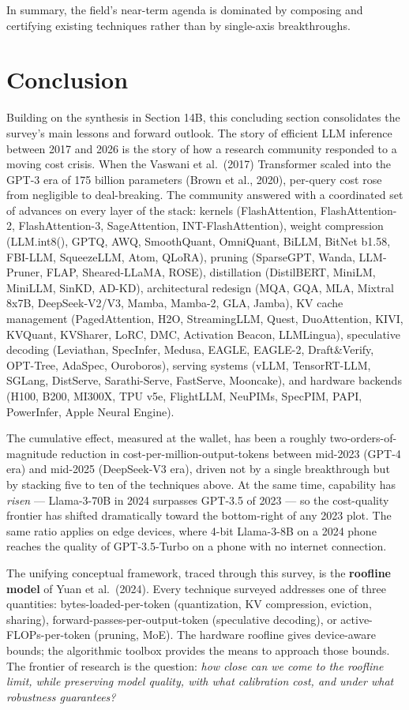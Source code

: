In summary, the field's near-term agenda is dominated by composing and certifying existing techniques rather than by single-axis breakthroughs.

\section{Conclusion}\label{conclusion}

Building on the synthesis in Section 14B, this concluding section consolidates the survey's main lessons and forward outlook. The story of efficient LLM inference between 2017 and 2026 is the story of how a research community responded to a moving cost crisis. When the Vaswani et al.~(2017) Transformer scaled into the GPT-3 era of 175 billion parameters (Brown et al., 2020), per-query cost rose from negligible to deal-breaking. The community answered with a coordinated set of advances on every layer of the stack: kernels (FlashAttention, FlashAttention-2, FlashAttention-3, SageAttention, INT-FlashAttention), weight compression (LLM.int8(), GPTQ, AWQ, SmoothQuant, OmniQuant, BiLLM, BitNet b1.58, FBI-LLM, SqueezeLLM, Atom, QLoRA), pruning (SparseGPT, Wanda, LLM-Pruner, FLAP, Sheared-LLaMA, ROSE), distillation (DistilBERT, MiniLM, MiniLLM, SinKD, AD-KD), architectural redesign (MQA, GQA, MLA, Mixtral 8x7B, DeepSeek-V2/V3, Mamba, Mamba-2, GLA, Jamba), KV cache management (PagedAttention, H2O, StreamingLLM, Quest, DuoAttention, KIVI, KVQuant, KVSharer, LoRC, DMC, Activation Beacon, LLMLingua), speculative decoding (Leviathan, SpecInfer, Medusa, EAGLE, EAGLE-2, Draft\&Verify, OPT-Tree, AdaSpec, Ouroboros), serving systems (vLLM, TensorRT-LLM, SGLang, DistServe, Sarathi-Serve, FastServe, Mooncake), and hardware backends (H100, B200, MI300X, TPU v5e, FlightLLM, NeuPIMs, SpecPIM, PAPI, PowerInfer, Apple Neural Engine).

The cumulative effect, measured at the wallet, has been a roughly two-orders-of-magnitude reduction in cost-per-million-output-tokens between mid-2023 (GPT-4 era) and mid-2025 (DeepSeek-V3 era), driven not by a single breakthrough but by stacking five to ten of the techniques above. At the same time, capability has \emph{risen} --- Llama-3-70B in 2024 surpasses GPT-3.5 of 2023 --- so the cost-quality frontier has shifted dramatically toward the bottom-right of any 2023 plot. The same ratio applies on edge devices, where 4-bit Llama-3-8B on a 2024 phone reaches the quality of GPT-3.5-Turbo on a phone with no internet connection.

The unifying conceptual framework, traced through this survey, is the \textbf{roofline model} of Yuan et al.~(2024). Every technique surveyed addresses one of three quantities: bytes-loaded-per-token (quantization, KV compression, eviction, sharing), forward-passes-per-output-token (speculative decoding), or active-FLOPs-per-token (pruning, MoE). The hardware roofline gives device-aware bounds; the algorithmic toolbox provides the means to approach those bounds. The frontier of research is the question: \emph{how close can we come to the roofline limit, while preserving model quality, with what calibration cost, and under what robustness guarantees?}

